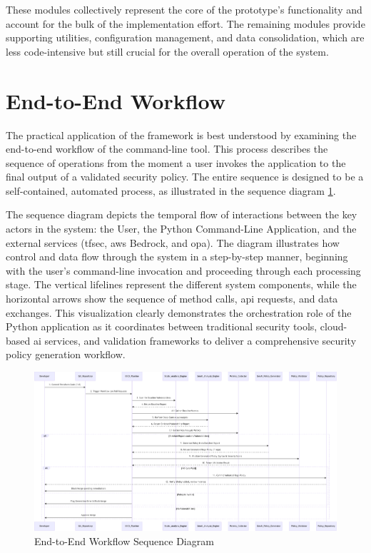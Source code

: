 These modules collectively represent the core of the prototype's functionality and account for the bulk of the implementation effort. The remaining modules provide supporting utilities, configuration management, and data consolidation, which are less code-intensive but still crucial for the overall operation of the system.

\section{End-to-End Workflow}


The practical application of the framework is best understood by examining the end-to-end workflow of the command-line tool. This process describes the sequence of operations from the moment a user invokes the application to the final output of a validated security policy. The entire sequence is designed to be a self-contained, automated process, as illustrated in the sequence diagram \ref{fig:e2e_workflow}.

The sequence diagram depicts the temporal flow of interactions between the key actors in the system: the User, the Python Command-Line Application, and the external services (tfsec, \gls{aws} Bedrock, and \gls{opa}). The diagram illustrates how control and data flow through the system in a step-by-step manner, beginning with the user's command-line invocation and proceeding through each processing stage. The vertical lifelines represent the different system components, while the horizontal arrows show the sequence of method calls, \gls{api} requests, and data exchanges. This visualization clearly demonstrates the \gls{orchestration} role of the Python application as it coordinates between traditional security tools, cloud-based \gls{ai} services, and validation frameworks to deliver a comprehensive security policy generation workflow.

\begin{landscape}
\thispagestyle{empty}
\begin{figure}[p]
\centering
\includegraphics[width=0.9\linewidth,height=0.7\textheight,keepaspectratio]{Figures/image.pdf}
\caption{End-to-End Workflow Sequence Diagram}
\label{fig:e2e_workflow}
\end{figure}
\end{landscape}

